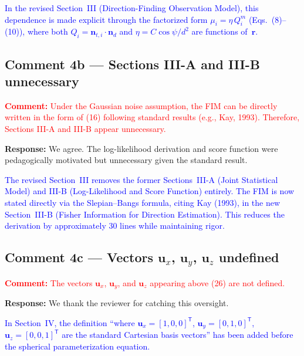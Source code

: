 \documentclass[11pt]{article}
\newcommand{\reviewercomment}[1]{\noindent\textcolor{red}{\textbf{Comment:} #1}\par\vspace{6pt}}
\newcommand{\response}{\noindent\textbf{Response:} }
\newcommand{\change}[1]{\textcolor{blue}{#1}}
\begin{document}
\change{In the revised Section~III (Direction-Finding Observation Model), this dependence is made explicit through the factorized form $\mu_i = \eta\,Q_i^m$ (Eqs.~(8)--(10)), where both $Q_i = \mathbf{n}_{t,i}\cdot\mathbf{n}_d$ and $\eta = C\cos\psi/d^2$ are functions of~$\mathbf{r}$.}

\subsection{Comment 4b --- Sections III-A and III-B unnecessary}

\reviewercomment{Under the Gaussian noise assumption, the FIM can be directly written in the form of (16) following standard results (e.g., Kay, 1993). Therefore, Sections III-A and III-B appear unnecessary.}

\response We agree. The log-likelihood derivation and score function were pedagogically motivated but unnecessary given the standard result.

\change{The revised Section~III removes the former Sections~III-A (Joint Statistical Model) and III-B (Log-Likelihood and Score Function) entirely. The FIM is now stated directly via the Slepian--Bangs formula, citing Kay (1993), in the new Section~III-B (Fisher Information for Direction Estimation). This reduces the derivation by approximately 30 lines while maintaining rigor.}

\subsection{Comment 4c --- Vectors $\mathbf{u}_x$, $\mathbf{u}_y$, $\mathbf{u}_z$ undefined}

\reviewercomment{The vectors $\mathbf{u}_x$, $\mathbf{u}_y$, and $\mathbf{u}_z$ appearing above (26) are not defined.}

\response We thank the reviewer for catching this oversight.

\change{In Section~IV, the definition ``where $\mathbf{u}_x = [1,0,0]^{\mathsf T}$, $\mathbf{u}_y = [0,1,0]^{\mathsf T}$, $\mathbf{u}_z = [0,0,1]^{\mathsf T}$ are the standard Cartesian basis vectors'' has been added before the spherical parameterization equation.}
\end{document}
